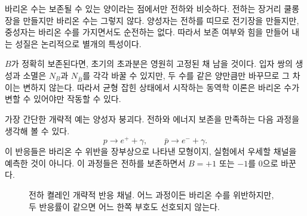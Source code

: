 바리온 수는 보존될 수 있는 양이라는 점에서만 전하와 비슷하다. 전하는 장거리 쿨롱장을 만들지만 바리온 수는 그렇지 않다. 양성자는 전하를 띠므로 전기장을 만들지만, 중성자는 바리온 수를 가지면서도 순전하는 없다. 따라서 보존 여부와 힘을 만들어 내는 성질은 논리적으로 별개의 특성이다.

\begin{classroomqa}
\end{classroomqa}

\(B\)가 정확히 보존된다면, 초기의 초과분은 영원히 고정된 채 남을 것이다. 입자 쌍의 생성과 소멸은 \(N_B\)과 \(N_{\bar B}\)를 각각 바꿀 수 있지만, 두 수를 같은 양만큼만 바꾸므로 그 차이는 변하지 않는다. 따라서 균형 잡힌 상태에서 시작하는 동역학 이론은 바리온 수가 변할 수 있어야만 작동할 수 있다.

가장 간단한 개략적 예는 양성자 붕괴다. 전하와 에너지 보존을 만족하는 다음 과정을 생각해 볼 수 있다.
\begin{equation}
p\longrightarrow e^+ +\gamma,
\qquad
\bar p\longrightarrow e^-+\gamma.
\label{eq:c08-decay-pair}
\end{equation}
이 반응들은 바리온 수 위반을 장부상으로 나타낸 모형이지, 실험에서 우세할 채널을 예측한 것이 아니다. 이 과정들은 전하를 보존하면서 \(B=+1\) 또는 \(-1\)를 0으로 바꾼다.

\begin{figure}[htbp]\centering
\begin{coursefitfigure}\end{coursefitfigure}\caption{전하 켤레인 개략적 반응 채널. 어느 과정이든 바리온 수를 위반하지만, 두 반응률이 같으면 어느 한쪽 부호도 선호되지 않는다.}\label{fig:c08-decay-redraw}\end{figure}

